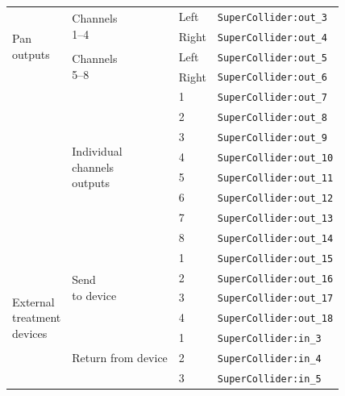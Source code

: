 \begin{table}
	\begin{center}
		\begin{tabular}{|l|l|l|l| }
			\hline
			\multirow{4}{*}{\parbox{5em}{Pan\\ outputs}} & \multirow{2}{*}{\parbox{5em}{  Channels\\ 1--4}} 
			 & Left & \texttt{SuperCollider:out\_3}\\			
			 & & Right & \texttt{SuperCollider:out\_4}\\	
			 \cline{2-4}
			 & \multirow{2}{*}{\parbox{5em}{  Channels\\ 5--8}} 
			 & Left & \texttt{SuperCollider:out\_5}\\	
			 & & Right & \texttt{SuperCollider:out\_6}\\			
			 \hline
			 \hline
			 \multirow{8}{*}{} & \multirow{8}{*}{ \parbox{5em}{ Individual\\ channels\\ outputs}}
			 & 1 & \texttt{SuperCollider:out\_7}\\			
			 & & 2 & \texttt{SuperCollider:out\_8}\\			
			 & & 3 & \texttt{SuperCollider:out\_9}\\			
			 & & 4 & \texttt{SuperCollider:out\_10}\\			
			 & & 5 & \texttt{SuperCollider:out\_11}\\			
			 & & 6 & \texttt{SuperCollider:out\_12}\\			
			 & & 7 & \texttt{SuperCollider:out\_13}\\			
			 & & 8 & \texttt{SuperCollider:out\_14}\\			
			 \hline
			 \hline
			 \multirow{8}{*}{\parbox{5em}{External\\ treatment\\ devices}} &  \multirow{4}{*}{\parbox{5em}{  Send\\ to device}}
			 & 1 & \texttt{SuperCollider:out\_15}\\			
			 & & 2 & \texttt{SuperCollider:out\_16}\\			
			 & & 3 & \texttt{SuperCollider:out\_17}\\			
			 & & 4 & \texttt{SuperCollider:out\_18}\\			
			 \cline{2-4}
			 & \multirow{4}{*}{\parbox{5em}{  Return from device}}
			 & 1 & \texttt{SuperCollider:in\_3}\\			
			 & & 2 & \texttt{SuperCollider:in\_4}\\			
			 & & 3 & \texttt{SuperCollider:in\_5}\\			

\end{tabular}
\end{center}
\end{table}
